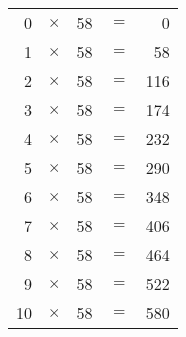 \begin{table}[h]
\begin{tabular}{|rcrcr|}
\hline
  0 & $\times$ &  58 & $=$ &   0\\
  1 & $\times$ &  58 & $=$ &  58\\
  2 & $\times$ &  58 & $=$ & 116\\
  3 & $\times$ &  58 & $=$ & 174\\
  4 & $\times$ &  58 & $=$ & 232\\
  5 & $\times$ &  58 & $=$ & 290\\
  6 & $\times$ &  58 & $=$ & 348\\
  7 & $\times$ &  58 & $=$ & 406\\
  8 & $\times$ &  58 & $=$ & 464\\
  9 & $\times$ &  58 & $=$ & 522\\
 10 & $\times$ &  58 & $=$ & 580\\
\hline
\end{tabular}
\end{table}
